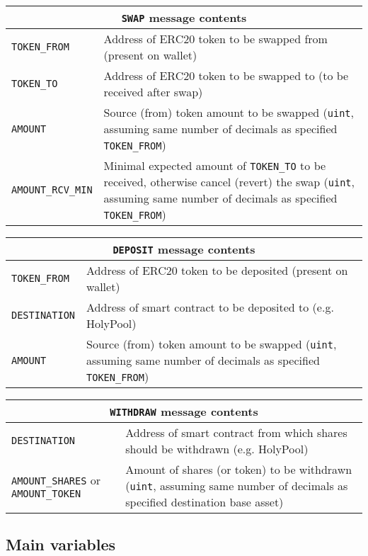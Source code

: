 \documentclass[12pt]{article}
\begin{document}
\begin{tabular}{ |p{3cm}|p{9cm}|  }
 \hline
 \multicolumn{2}{|c|}{\texttt{SWAP} message contents} \\
 \hline
 \texttt{TOKEN\_FROM}& Address of ERC20 token to be swapped from (present on wallet)\\
 \texttt{TOKEN\_TO}& Address of ERC20 token to be swapped to (to be received after swap)\\
 \texttt{AMOUNT}& Source (from) token amount to be swapped (\texttt{uint}, assuming same number of decimals as specified \texttt{TOKEN\_FROM})\\
 \texttt{AMOUNT\_RCV\_MIN}& Minimal expected amount of \texttt{TOKEN\_TO} to be received, otherwise cancel (revert) the swap (\texttt{uint}, assuming same number of decimals as specified \texttt{TOKEN\_FROM})\\
 \hline
\end{tabular}

\begin{tabular}{ |p{3cm}|p{9cm}|  }
 \hline
 \multicolumn{2}{|c|}{\texttt{DEPOSIT} message contents} \\
 \hline
 \texttt{TOKEN\_FROM}& Address of ERC20 token to be deposited (present on wallet)\\
 \texttt{DESTINATION}& Address of smart contract to be deposited to (e.g. HolyPool)\\
 \texttt{AMOUNT}& Source (from) token amount to be swapped (\texttt{uint}, assuming same number of decimals as specified \texttt{TOKEN\_FROM})\\
 \hline
\end{tabular}

\begin{tabular}{ |p{3cm}|p{9cm}|  }
 \hline
 \multicolumn{2}{|c|}{\texttt{WITHDRAW} message contents} \\
 \hline
 \texttt{DESTINATION}& Address of smart contract from which shares should be withdrawn (e.g. HolyPool)\\
 \texttt{AMOUNT\_SHARES} or \texttt{AMOUNT\_TOKEN}& Amount of shares (or token) to be withdrawn (\texttt{uint}, assuming same number of decimals as specified destination base asset)\\
 \hline
\end{tabular}


\subsection{Main variables}
\end{document}
